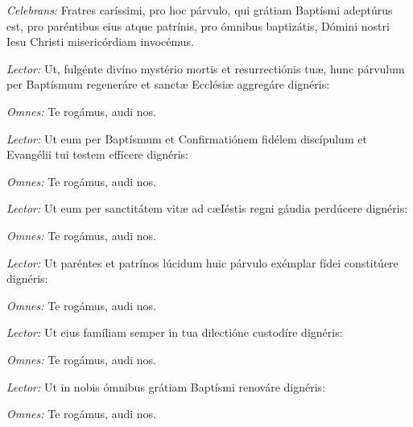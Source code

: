 \textit{Celebrans:} Fratres caríssimi, pro hoc párvulo, qui grátiam Baptísmi
adeptúrus est, pro paréntibus eius atque patrínis, pro ómnibus baptizátis,
Dómini nostri Iesu Christi misericórdiam invocémus.

\textit{Lector:} Ut, fulgénte divíno mystério mortis et resurrectiónis tuæ,
hunc párvulum per Baptísmum regeneráre et sanctæ Ecclésiæ aggregáre
dignéris:

\textit{Omnes:} Te rogámus, audi nos.

\textit{Lector:} Ut eum per Baptísmum et Confirmatiónem fidélem
discípulum et Evangélii tui testem effícere dignéris:

\textit{Omnes:} Te rogámus, audi nos.

\textit{Lector:} Ut eum per sanctitátem vitæ ad cæIéstis regni gáudia
perdúcere dignéris:

\textit{Omnes:} Te rogámus, audi nos.

\textit{Lector:} Ut paréntes et patrínos lúcidum huic párvulo exémplar
fídei constitúere dignéris:

\textit{Omnes:} Te rogámus, audi nos.

\textit{Lector:} Ut eius famíliam semper in tua dilectióne custodíre
dignéris:

\textit{Omnes:} Te rogámus, audi nos.

\textit{Lector:} Ut in nobis ómnibus grátiam Baptísmi renováre dignéris:

\textit{Omnes:} Te rogámus, audi nos.
